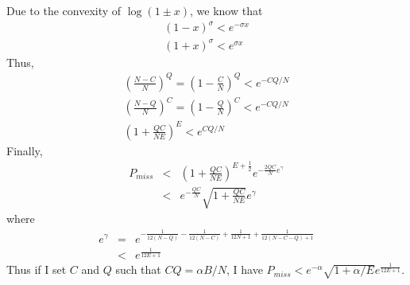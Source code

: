 \documentclass[9.5pt,journal,final,finalsubmission,twocolumn]{IEEEtran}
\begin{document}
Due to the convexity of $\log{(1\pm x)}$, we know that
\begin{eqnarray}
(1-x)^\sigma<e^{-\sigma x}\\
(1+x)^\sigma<e^{\sigma x}
\end{eqnarray}
Thus, 
\begin{eqnarray}
\left(\frac{N-C}{N}\right)^{Q} = \left(1-\frac{C}{N}\right)^Q < e^{-CQ/N}\\
\left(\frac{N-Q}{N}\right)^{C} = \left(1-\frac{Q}{N}\right)^C < e^{-CQ/N}\\
\left(1+\frac{QC}{NE}\right)^{E} < e^{CQ/N}
\end{eqnarray}
Finally,
\begin{eqnarray}
P_{miss} &<& \left(1+\frac{QC}{NE}\right)^{E+\frac{1}{2}} e^{-\frac{2QC}{N} e^{\gamma}}\\
         &<&e^{-\frac{QC}{N}} \sqrt{1+\frac{QC}{NE}} e^{\gamma}
\end{eqnarray}
where 
\begin{eqnarray}
e^{\gamma}&=&e^{-\frac{1}{12(N-Q)}-\frac{1}{12(N-C)}+\frac{1}{12N+1}+\frac{1}{12(N-C-Q)+1}}\\
          &<& e^{\frac{1}{12E+1}}
\end{eqnarray}
Thus if I set $C$ and $Q$ such that $CQ=\alpha B/N$, I have $P_{miss}< e^{-\alpha}\sqrt{1+\alpha/E}e^{\frac{1}{12E+1}}$.
\end{document}
